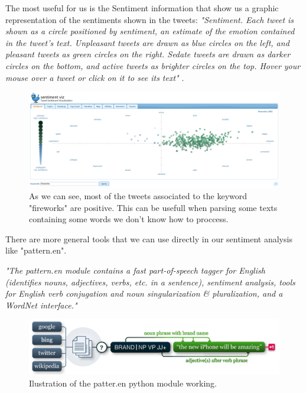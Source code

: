 \documentclass[12pt,twoside]{article}
\theoremstyle{plain}
\theoremstyle{definition}
\theoremstyle{remark}
\begin{document}
		The most useful for us is the Sentiment information that show us a graphic representation of the sentiments shown in the tweets: \textit{"Sentiment. Each tweet is shown as a circle positioned by sentiment, an estimate of the emotion contained in the tweet's text. Unpleasant tweets are drawn as blue circles on the left, and pleasant tweets as green circles on the right. Sedate tweets are drawn as darker circles on the bottom, and active tweets as brighter circles on the top. Hover your mouse over a tweet or click on it to see its text"} \cite{tweet_sentiment_analysis}.
			
		\begin{figure}[h]
			\centering
			\includegraphics[scale=0.35]{./Pictures/fireworks_sentiment_visualization.png}
			\caption{As we can see, most of the tweets associated to the keyword "fireworks" are positive. This can be usefull when parsing some texts containing some words we don't know how to proccess.} 
		\end{figure}
	
		There are more general tools that we can use directly in our sentiment analysis like "pattern.en".
		
		\textit{"The pattern.en module contains a fast part-of-speech tagger for English (identifies nouns, adjectives, verbs, etc. in a sentence), sentiment analysis, tools for English verb conjugation and noun singularization \& pluralization, and a WordNet interface."} \cite{python_module}
		
		\begin{figure}[h]
			\centering
			\includegraphics[scale=0.8]{./Pictures/python_module.png}
			\caption{Ilustration of the patter.en python module working.} 
		\end{figure}
	
\end{document}
